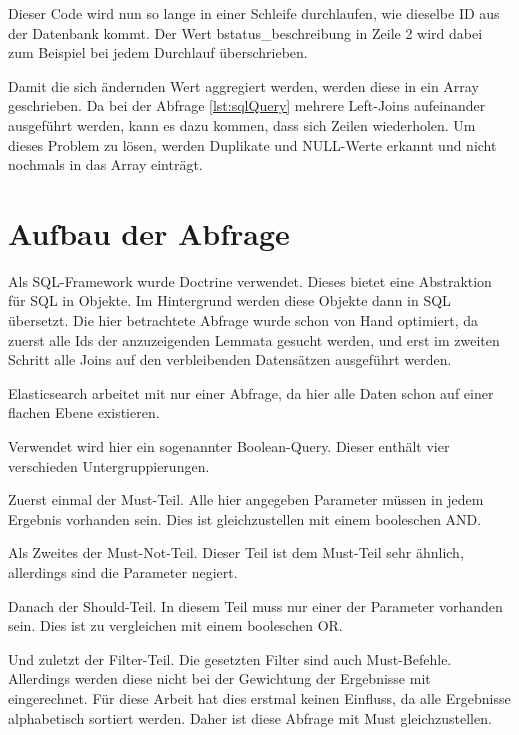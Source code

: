 Dieser Code wird nun so lange in einer Schleife durchlaufen, wie dieselbe ID aus der Datenbank kommt. Der Wert bstatus\_beschreibung in Zeile 2 wird dabei zum Beispiel bei jedem Durchlauf überschrieben. 

Damit die sich ändernden Wert aggregiert werden, werden diese in ein Array geschrieben. Da bei der Abfrage \ref{lst:sqlQuery} mehrere Left-Joins aufeinander ausgeführt werden, kann es dazu kommen, dass sich Zeilen wiederholen. Um dieses Problem zu lösen, werden Duplikate und NULL-Werte erkannt und nicht nochmals in das Array einträgt.

\section{Aufbau der Abfrage}

Als SQL-Framework wurde Doctrine verwendet. Dieses bietet eine Abstraktion für SQL in Objekte. Im Hintergrund werden diese Objekte dann in SQL übersetzt. Die hier betrachtete Abfrage wurde schon von Hand optimiert, da zuerst alle Ids der anzuzeigenden Lemmata gesucht werden, und erst im zweiten Schritt alle Joins auf den verbleibenden Datensätzen ausgeführt werden.

Elasticsearch arbeitet mit nur einer Abfrage, da hier alle Daten schon auf einer flachen Ebene existieren.

Verwendet wird hier ein sogenannter Boolean-Query. Dieser enthält vier verschieden Untergruppierungen.

Zuerst einmal der Must-Teil. Alle hier angegeben Parameter müssen in jedem Ergebnis vorhanden sein. Dies ist gleichzustellen mit einem booleschen AND. 

Als Zweites der Must-Not-Teil. Dieser Teil ist dem Must-Teil sehr ähnlich, allerdings sind die Parameter negiert.

Danach der Should-Teil. In diesem Teil muss nur einer der Parameter vorhanden sein. Dies ist zu vergleichen mit einem booleschen OR. 

Und zuletzt der Filter-Teil. Die gesetzten Filter sind auch Must-Befehle. Allerdings werden diese nicht bei der Gewichtung der Ergebnisse mit eingerechnet. Für diese Arbeit hat dies erstmal keinen Einfluss, da alle Ergebnisse alphabetisch sortiert werden. Daher ist diese Abfrage mit Must gleichzustellen. \cite{ElasticsearchB.V..17.12.2019}


